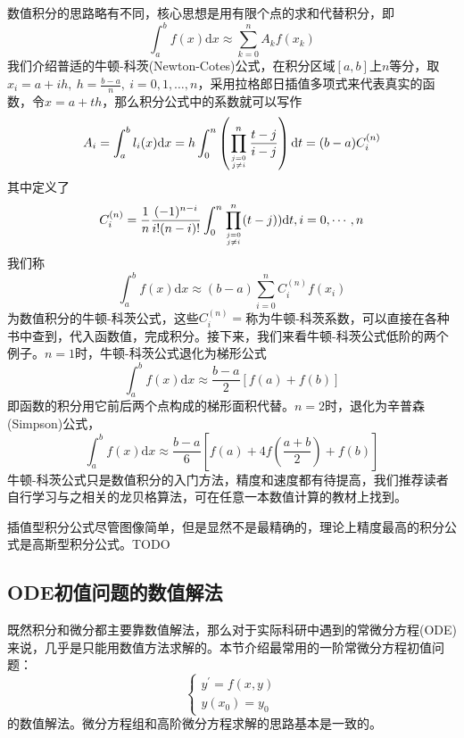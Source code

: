\documentclass[12pt,a4paper,openany,twoside]{book}
\numberwithin{equation}{section}
\newcommand{\ud}{\mathrm{d}}
\begin{document}
            数值积分的思路略有不同，核心思想是用有限个点的求和代替积分，即
            \begin{equation}
              \int_{a}^{b} f(x) \ud x \approx \sum_{k=0}^{n} A_{k} f\left(x_{k}\right)
            \end{equation}
            我们介绍普适的牛顿-科茨(Newton-Cotes)公式，在积分区域$[a,b]$上$n$等分，取$x_i=a+ih,\ h=\frac{b-a}{n},\ i =0,1,\dots,n$，采用拉格郎日插值多项式来代表真实的函数，令$x=a+th$，那么积分公式中的系数就可以写作
            \begin{equation}
              A_{i}=\int_{a}^{b} l_{i}(x) \ud x=h \int_{0}^{n}\left(\prod_{j=0 \atop j \neq i}^{n} \frac{t-j}{i-j}\right) \ud t=(b-a) C_{i}^{(n)}
            \end{equation}
            其中定义了
            \begin{equation}
              C_{i}^{(n)}=\frac{1}{n} \frac{(-1)^{n-i}}{i !(n-i) !} \int_{0}^{n} \prod_{j=0 \atop j \neq i}^{n}(t-j) ) \ud t, i=0, \cdots, n
            \end{equation}
            我们称
            \begin{equation}
              \int_{a}^{b} f(x) \ud x \approx(b-a) \sum_{i=0}^{n} C_{i}^{(n)} f\left(x_{i}\right)
            \end{equation}
            为数值积分的牛顿-科茨公式，这些$C_{i}^{(n)}=$称为牛顿-科茨系数，可以直接在各种书中查到，代入函数值，完成积分。接下来，我们来看牛顿-科茨公式低阶的两个例子。$n=1$时，牛顿-科茨公式退化为梯形公式
            \begin{equation}
              \int_{a}^{b} f(x) \ud x \approx \frac{b-a}{2}[f(a)+f(b)]
            \end{equation}
            即函数的积分用它前后两个点构成的梯形面积代替。$n=2$时，退化为辛普森(Simpson)公式，
            \begin{equation}
              \int_{a}^{b} f(x) \ud x \approx \frac{b-a}{6}\left[f(a)+4 f\left(\frac{a+b}{2}\right)+f(b)\right]
            \end{equation}
            牛顿-科茨公式只是数值积分的入门方法，精度和速度都有待提高，我们推荐读者自行学习与之相关的龙贝格算法，可在任意一本数值计算的教材上找到。

            插值型积分公式尽管图像简单，但是显然不是最精确的，理论上精度最高的积分公式是高斯型积分公式。TODO
          \subsection{ODE初值问题的数值解法}
            既然积分和微分都主要靠数值解法，那么对于实际科研中遇到的常微分方程(ODE)来说，几乎是只能用数值方法求解的。本节介绍最常用的一阶常微分方程初值问题：
            \begin{equation*}
              \left\{\begin{array}{l}
                {y^{\prime}=f(x, y)} \\
                {y\left(x_{0}\right)=y_{0}}
              \end{array}\right.
            \end{equation*}
            的数值解法。微分方程组和高阶微分方程求解的思路基本是一致的。
\end{document}
